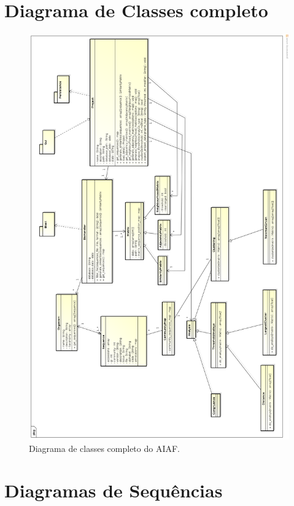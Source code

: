 \appendix

\chapter{Diagrama de Classes completo}

\begin{figure}
\centering
\includegraphics[scale=0.28]{diagrama-classes-completo}
\caption{Diagrama de classes completo do AIAF.}
\label{fig:diagrama-classes-completo}
\end{figure}

\chapter{Diagramas de Sequências}

